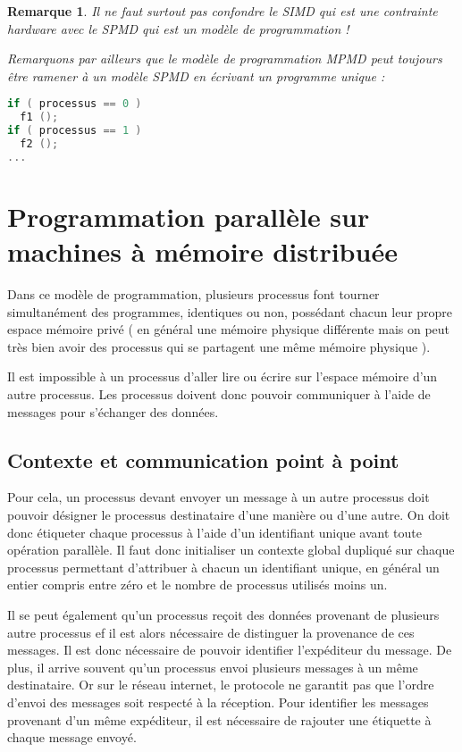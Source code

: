 \documentclass[fleqn,11pt]{article}
\newtheorem{remark}{Remarque }
\begin{document}
\begin{remark}
Il ne faut surtout pas confondre le SIMD qui est une contrainte hardware avec
le SPMD qui est un modèle de programmation ! 

Remarquons par ailleurs que le modèle de programmation MPMD peut toujours 
être ramener à un modèle SPMD en écrivant un programme unique :

\begin{lstlisting}[language=C++]
if ( processus == 0 )
  f1 ();
if ( processus == 1 )
  f2 ();
...
\end{lstlisting} 
\end{remark}

\section{Programmation parallèle sur machines à mémoire distribuée}

Dans ce modèle de programmation, plusieurs processus font tourner 
simultanément des programmes,
identiques ou non, possédant chacun leur propre espace mémoire privé ( en général
une mémoire physique différente mais on peut très bien avoir des processus qui
se partagent une même mémoire physique ).

Il est impossible à un processus d'aller lire ou écrire sur l'espace mémoire d'un autre
processus. Les processus doivent donc pouvoir communiquer à l'aide de messages pour
s'échanger des données.

\subsection{Contexte et communication point à point}

Pour cela, un processus devant envoyer un message à un autre processus doit
pouvoir désigner le processus destinataire d'une manière ou d'une autre.
On doit donc étiqueter chaque processus à l'aide d'un identifiant unique
avant toute opération parallèle. Il faut donc initialiser un contexte
global dupliqué sur chaque processus permettant d'attribuer à chacun un identifiant
unique, en général un entier compris entre zéro et le nombre 
de processus utilisés moins un.

Il se peut également qu'un processus reçoit des données provenant de plusieurs
autre processus ef il est alors nécessaire de distinguer la provenance de ces messages.
Il est donc nécessaire de pouvoir identifier l'expéditeur du message. De plus, il
arrive souvent qu'un processus envoi plusieurs messages à un même destinataire. Or
sur le réseau internet, le protocole ne garantit pas que l'ordre d'envoi
des messages soit respecté à la réception. Pour identifier les messages provenant
d'un même expéditeur, il est nécessaire de rajouter une étiquette à chaque message
envoyé.
\end{document}
